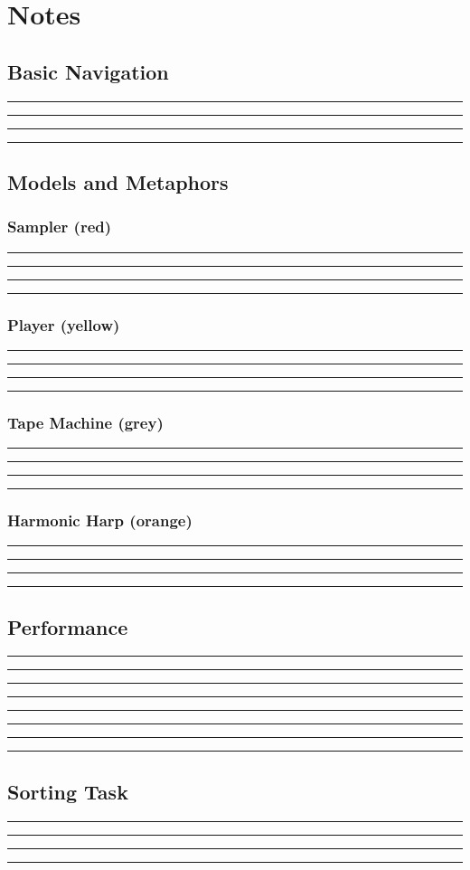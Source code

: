 \documentclass[10pt,a4paper]{scrartcl}
\begin{document}
\section{Notes}
\subsection{Basic Navigation}
\rule{\linewidth}{0.25pt}
\rule{\linewidth}{0.25pt}
\rule{\linewidth}{0.25pt}
\rule{\linewidth}{0.25pt}

\subsection{Models and Metaphors}
\subsubsection{Sampler (red)}
\rule{\linewidth}{0.25pt}
\rule{\linewidth}{0.25pt}
\rule{\linewidth}{0.25pt}
\rule{\linewidth}{0.25pt}

\subsubsection{Player (yellow)}
\rule{\linewidth}{0.25pt}
\rule{\linewidth}{0.25pt}
\rule{\linewidth}{0.25pt}
\rule{\linewidth}{0.25pt}

\subsubsection{Tape Machine (grey)}
\rule{\linewidth}{0.25pt}
\rule{\linewidth}{0.25pt}
\rule{\linewidth}{0.25pt}
\rule{\linewidth}{0.25pt}

\subsubsection{Harmonic Harp (orange)}
\rule{\linewidth}{0.25pt}
\rule{\linewidth}{0.25pt}
\rule{\linewidth}{0.25pt}
\rule{\linewidth}{0.25pt}


\subsection{Performance}
\rule{\linewidth}{0.25pt}
\rule{\linewidth}{0.25pt}
\rule{\linewidth}{0.25pt}
\rule{\linewidth}{0.25pt}
\rule{\linewidth}{0.25pt}
\rule{\linewidth}{0.25pt}
\rule{\linewidth}{0.25pt}
\rule{\linewidth}{0.25pt}

\subsection{Sorting Task}
\rule{\linewidth}{0.25pt}
\rule{\linewidth}{0.25pt}
\rule{\linewidth}{0.25pt}
\rule{\linewidth}{0.25pt}
\end{document}
